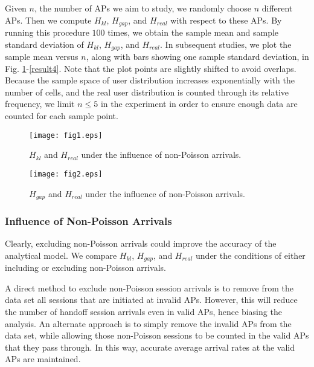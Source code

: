 Given $n$, the number of APs we aim to study, we randomly choose $n$ different APs. Then we compute $H_{kl}$, $H_{gap}$, and $H_{real}$ with respect to these APs.  By running this procedure $100$ times, we obtain the sample mean and sample standard deviation of $H_{kl}$, $H_{gap}$, and $H_{real}$.   In subsequent studies, we plot the sample mean versus $n$, along with bars showing one sample standard deviation, in Fig. \ref{result1}-\ref{result4}.  Note that the plot points are slightly shifted to avoid overlaps. Because the sample space of user distribution increases exponentially with the number of cells, and the real user distribution is counted through its relative frequency, we limit $n\leq5$ in the experiment in order to ensure enough data are counted for each sample point.



\begin{figure}[tbp]
\centering
\texttt{[image: fig1.eps]}
\caption{$H_{kl}$ and $H_{real}$ under the influence of non-Poisson arrivals.}
\label{result1}
\end{figure}

\begin{figure}[tbp]
\centering
\texttt{[image: fig2.eps]}
\caption{$H_{gap}$ and $H_{real}$ under the influence of non-Poisson arrivals.}
\label{result2}
\end{figure}




\subsubsection{Influence of Non-Poisson Arrivals} \label{sec:EffectNon-Poisson}

Clearly, excluding non-Poisson arrivals could improve the accuracy of the analytical model.
We compare $H_{kl}$, $H_{gap}$, and $H_{real}$ under the conditions of either including or excluding non-Poisson arrivals.

A direct method to exclude non-Poisson session arrivals is to remove from the data set all sessions that are initiated at invalid APs.  However, this will reduce the number of handoff session arrivals even in valid APs, hence biasing the analysis.  An alternate approach is to simply remove the invalid APs from the data set, while allowing those non-Poisson sessions to be counted in the valid APs that they pass through. In this way, accurate average arrival rates at the valid APs are maintained.


